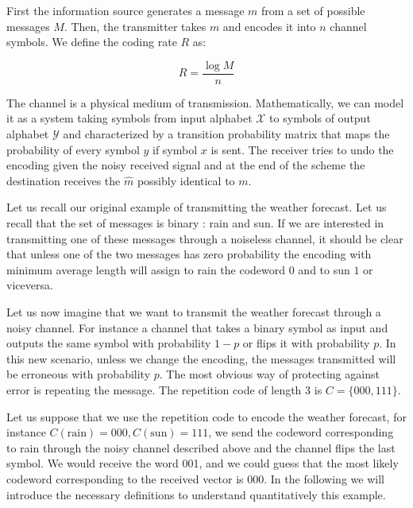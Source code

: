 First the information source generates a message $m$ from a set of possible messages $M$. Then, the transmitter takes $m$ and encodes it into $n$ channel symbols. We define the coding rate $R$ as:

\begin{equation}
R=\frac{\log M}{n}
\end{equation}

The channel is a physical medium of transmission. Mathematically, we can model it as a system taking symbols from input alphabet $\mathcal{X}$ to symbols of output alphabet $\mathcal{Y}$ and characterized by a transition probability matrix that maps the probability of every symbol $y$ if symbol $x$ is sent. The receiver tries to undo the encoding given the noisy received signal and at the end of the scheme the destination receives the ${\hat{m}}$ possibly identical to $m$.

Let us recall our original example of transmitting the weather forecast. Let us recall that the set of messages is binary : rain and sun. If we are interested in transmitting one of these messages through a noiseless channel, it should be clear that unless one of the two messages has zero probability the encoding with minimum average length will assign to rain the codeword $0$ and to sun $1$ or viceversa. 

Let us now imagine that we want to transmit the weather forecast through a noisy channel. For instance a channel that takes a binary symbol as input and outputs the same symbol with probability $1-p$ or flips it with probability $p$. In this new scenario, unless we change the encoding, the messages transmitted will be erroneous with probability $p$. The most obvious way of protecting against error is repeating the message. The repetition code of length $3$ is $C=\{000,111\}$. 

Let us suppose that we use the repetition code to encode the weather forecast, for instance $C(\text{rain})=000,C(\text{sun})=111$, we send the codeword corresponding to rain through the noisy channel described above and the channel flips the last symbol. We would receive the word 001, and we could guess that the most likely codeword corresponding to the received vector is 000. In the following we will introduce the necessary definitions to understand quantitatively this example. 

